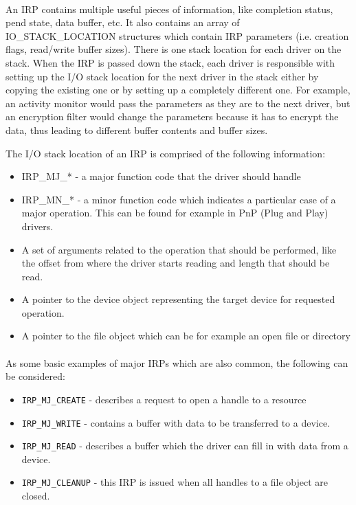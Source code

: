 		\paragraph{}
		An IRP contains multiple useful pieces of information, like completion status, pend state, data buffer, etc. It also contains an array of IO\_STACK\_LOCATION structures which contain IRP parameters (i.e. creation flags, read/write buffer sizes). There is one stack location for each driver on the stack. When the IRP is passed down the stack, each driver is responsible with setting up the I/O stack location for the next driver in the stack either by copying the existing one or by setting up a completely different one. For example, an activity monitor would pass the parameters as they are to the next driver, but an encryption filter would change the parameters because it has to encrypt the data, thus leading to different buffer contents and buffer sizes.
		
		
		The I/O stack location of an IRP is comprised of the following information\cite{MSDNIOStackLocations}:
		\begin{itemize}
			\item IRP\_MJ\_*  - a major function code that the driver should handle
			\item IRP\_MN\_*  - a minor function code which indicates a particular case of a major operation. This can be found for example in PnP (Plug and Play) drivers. 
			\item A set of arguments related to the operation that should be performed, like the offset from where the driver starts reading and length that should be read.
			\item A pointer to the device object representing the target device for requested operation.
			\item A pointer to the file object which can be for example an open file or directory
		\end{itemize}
		
		\paragraph{}
		As some basic examples of major IRPs which are also common, the following can be considered:		
		\begin{itemize}
			\item \texttt{IRP\_MJ\_CREATE} - describes a request to open a handle to a resource
			\item \texttt{IRP\_MJ\_WRITE} - contains a buffer with data to be transferred to a device.
			\item \texttt{IRP\_MJ\_READ} - describes a buffer which the driver can fill in with data from a device.
			\item \texttt{IRP\_MJ\_CLEANUP} - this IRP is issued when all handles to a file object are closed.
		\end{itemize}
	
